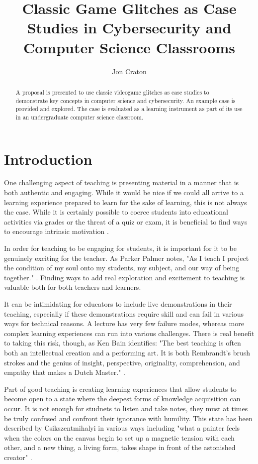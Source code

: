 \documentclass[letterpaper]{article}
\title{Classic Game Glitches as Case Studies in Cybersecurity and Computer Science Classrooms}
\author[1]{Jon Craton}
\affil[1]{Anderson University, Anderson, IN}
\date{} %
\begin{document}
\maketitle

\begin{abstract}
A proposal is presented to use classic videogame glitches as case studies to demonstrate key concepts in computer science and cybersecurity. An example case is provided and explored. The case is evaluated as a learning instrument as part of its use in an undergraduate computer science classroom.
\end{abstract}

\section{Introduction}
One challenging aspect of teaching is presenting material in a manner that is both authentic and engaging. While it would be nice if we could all arrive to a learning experience prepared to learn for the sake of learning, this is not always the case. While it is certainly possible to coerce students into educational activities via grades or the threat of a quiz or exam, it is beneficial to find ways to encourage intrinsic motivation \cite{deci2013intrinsic}.

In order for teaching to be engaging for students, it is important for it to be genuinely exciting for the teacher. As Parker Palmer notes, "As I teach I project the condition of my soul onto my students, my subject, and our way of being together." \cite{palmer2000courage}. Finding ways to add real exploration and excitement to teaching is valuable both for both teachers and learners.

It can be intimidating for educators to include live demonstrations in their teaching, especially if these demonstrations require skill and can fail in various ways for technical reasons. A lecture has very few failure modes, whereas more complex learning experiences can run into various challenges. There is real benefit to taking this risk, though, as Ken Bain identifies: "The best teaching is often both an intellectual creation and a performing art. It is both Rembrandt’s brush strokes and the genius of insight, perspective, originality, comprehension, and empathy that makes a Dutch Master." \cite{bain2004best}.

Part of good teaching is creating learning experiences that allow students to become open to a state where the deepest forms of knowledge acquisition can occur. It is not enough for studnets to listen and take notes, they must at times be truly confused and confront their ignorance with humility. This state has been described by Csikszentmihalyi in various ways including  "what a painter feels when the colors on the canvas begin to set up a magnetic tension with each other, and a new thing, a living form, takes shape in front of the astonished creator" \cite{csikszentmihalyi1990flow}.
\end{document}
